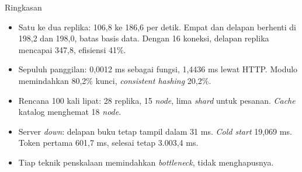 \documentclass[aspectratio=169, table, 12pt]{beamer}
\begin{document}
\begin{frame}{{\Large Ringkasan}}
  \vspace{8pt}
  \begin{itemize}
    \item Satu ke dua replika: 106,8 ke 186,6 per detik. Empat dan delapan
          berhenti di 198,2 dan 198,0, batas basis data. Dengan 16 koneksi,
          delapan replika mencapai 347,8, efisiensi 41\%.
    \item Sepuluh panggilan: 0,0012 ms sebagai fungsi, 1,4436 ms lewat HTTP.
          Modulo memindahkan 80,2\% kunci, \textit{consistent hashing} 20,2\%.
    \item Rencana 100 kali lipat: 28 replika, 15 \textit{node}, lima
          \textit{shard} untuk pesanan. \textit{Cache} katalog menghemat 18
          \textit{node}.
    \item Server \textit{down}: delapan buku tetap tampil dalam 31 ms. \textit{Cold
          start} 19,069 ms. Token pertama 601,7 ms, selesai tetap 3.003,4 ms.
    \item Tiap teknik penskalaan memindahkan \textit{bottleneck}, tidak
          menghapusnya.
  \end{itemize}
\end{frame}
\end{document}
